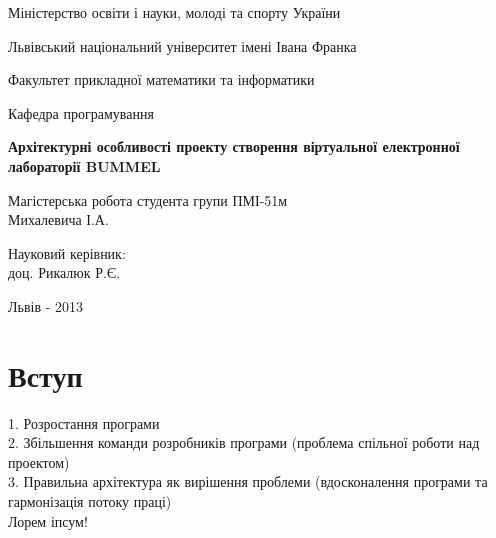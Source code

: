 \documentclass[12pt,a4paper]{article}
\begin{document}

\pagestyle{empty}
\setlength{\parindent}{1.5cm}
\fontsize{14pt}{6mm}\selectfont

\begin{center}
  Міністерство освіти і науки, молоді та спорту України
  
  Львівський національний університет імені Івана Франка

  Факультет прикладної математики та інформатики
\end{center}

\vspace{1cm}

\begin{flushright}
  Кафедра програмування
\end{flushright}

\vspace{4cm}

\begin{center}
  {\bfseries\Large Архітектурні особливості проекту створення віртуальної електронної лабораторії BUMMEL}
\end{center}

\vspace{2cm}

\begin{small}
\begin{flushleft}
  Магістерська робота студента групи ПМІ-51м\\
  Михалевича І.А.\linebreak
  
  Науковий керівник:\\
  доц. Рикалюк Р.Є.
\end{flushleft}
\end{small}

\vspace{4cm}

\begin{center}
  Львів - 2013
\end{center}

\clearpage



\fontsize{14pt}{6mm}\selectfont

\tableofcontents
\clearpage
\pagestyle{plain}
\section{Вступ}

1. Розростання програми\\
2. Збільшення команди розробників програми (проблема спільної роботи над проектом)\\
3. Правильна архітектура як вирішення проблеми (вдосконалення програми та гармонізація потоку праці)\\
Лорем іпсум!\cite{alias}
\end{document}
